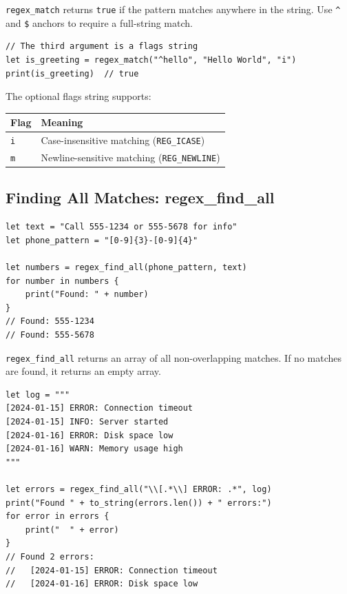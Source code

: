 \lstinline|regex_match| returns \lstinline|true| if the pattern matches
anywhere in the string. Use \texttt{\^{}} and \texttt{\$} anchors to require
a full-string match.

\begin{lstlisting}[language=Lattice, caption={Case-insensitive matching with flags}]
// The third argument is a flags string
let is_greeting = regex_match("^hello", "Hello World", "i")
print(is_greeting)  // true
\end{lstlisting}

The optional flags string supports:

\begin{center}
\begin{tabular}{ll}
\toprule
\textbf{Flag} & \textbf{Meaning} \\
\midrule
\texttt{i} & Case-insensitive matching (\texttt{REG\_ICASE}) \\
\texttt{m} & Newline-sensitive matching (\texttt{REG\_NEWLINE}) \\
\bottomrule
\end{tabular}
\end{center}

\subsection{Finding All Matches: regex\_find\_all}\label{sec:regex-find}

\begin{lstlisting}[language=Lattice, caption={Finding all pattern matches in a string}]
let text = "Call 555-1234 or 555-5678 for info"
let phone_pattern = "[0-9]{3}-[0-9]{4}"

let numbers = regex_find_all(phone_pattern, text)
for number in numbers {
    print("Found: " + number)
}
// Found: 555-1234
// Found: 555-5678
\end{lstlisting}

\lstinline|regex_find_all| returns an array of all non-overlapping matches.
If no matches are found, it returns an empty array.

\begin{lstlisting}[language=Lattice, caption={Extracting data from structured text}]
let log = """
[2024-01-15] ERROR: Connection timeout
[2024-01-15] INFO: Server started
[2024-01-16] ERROR: Disk space low
[2024-01-16] WARN: Memory usage high
"""

let errors = regex_find_all("\\[.*\\] ERROR: .*", log)
print("Found " + to_string(errors.len()) + " errors:")
for error in errors {
    print("  " + error)
}
// Found 2 errors:
//   [2024-01-15] ERROR: Connection timeout
//   [2024-01-16] ERROR: Disk space low
\end{lstlisting}

